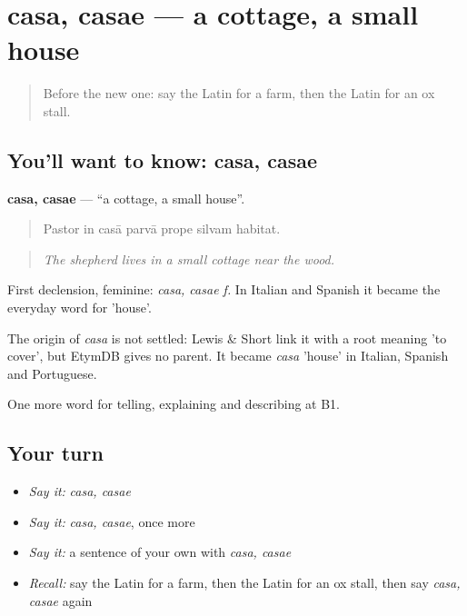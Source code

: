 \section[casa, casae]{casa, casae — a cottage, a small house}

\label{lesson:LA-C473-casa}



\begin{quote}
Before the new one: say the Latin for a farm, then the Latin for an ox stall.
\end{quote}

\subsection*{You'll want to know: casa, casae}
\textbf{casa, casae} — \textquotedblleft{}a cottage, a small house\textquotedblright{}.

\begin{quote}
Pastor in casā parvā prope silvam habitat.
\end{quote}

\begin{quote}
\emph{The shepherd lives in a small cottage near the wood.}
\end{quote}

First declension, feminine: \emph{casa, casae f.} In Italian and Spanish it became the everyday word for 'house'.

\begin{cousinweb}
The origin of \emph{casa} is not settled: Lewis \& Short link it with a root meaning 'to cover', but EtymDB gives no parent. It became \emph{casa} 'house' in Italian, Spanish and Portuguese.
\end{cousinweb}

\begin{grammarlens}[title={What you've built}]
One more word for telling, explaining and describing at B1.
\end{grammarlens}

\subsection*{Your turn}
\begin{itemize}
\raggedright
  \item \emph{Say it:} \emph{casa, casae}
  \item \emph{Say it:} \emph{casa, casae}, once more
  \item \emph{Say it:} a sentence of your own with \emph{casa, casae}
  \item \emph{Recall:} say the Latin for a farm, then the Latin for an ox stall, then say \emph{casa, casae} again
\end{itemize}

